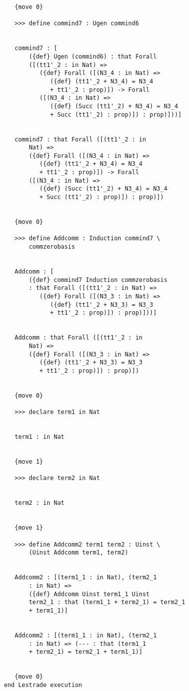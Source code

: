 \documentclass[12pt]{article}
\begin{document}
\begin{verbatim}
   {move 0}

   >>> define commind7 : Ugen commind6


   commind7 : [
       ({def} Ugen (commind6) : that Forall 
       ([(tt1'_2 : in Nat) => 
          ({def} Forall ([(N3_4 : in Nat) => 
             ({def} (tt1'_2 + N3_4) = N3_4 
             + tt1'_2 : prop)]) -> Forall 
          ([(N3_4 : in Nat) => 
             ({def} (Succ (tt1'_2) + N3_4) = N3_4 
             + Succ (tt1'_2) : prop)]) : prop)]))]


   commind7 : that Forall ([(tt1'_2 : in 
       Nat) => 
       ({def} Forall ([(N3_4 : in Nat) => 
          ({def} (tt1'_2 + N3_4) = N3_4 
          + tt1'_2 : prop)]) -> Forall 
       ([(N3_4 : in Nat) => 
          ({def} (Succ (tt1'_2) + N3_4) = N3_4 
          + Succ (tt1'_2) : prop)]) : prop)])


   {move 0}

   >>> define Addcomm : Induction commind7 \
       commzerobasis


   Addcomm : [
       ({def} commind7 Induction commzerobasis 
       : that Forall ([(tt1'_2 : in Nat) => 
          ({def} Forall ([(N3_3 : in Nat) => 
             ({def} (tt1'_2 + N3_3) = N3_3 
             + tt1'_2 : prop)]) : prop)]))]


   Addcomm : that Forall ([(tt1'_2 : in 
       Nat) => 
       ({def} Forall ([(N3_3 : in Nat) => 
          ({def} (tt1'_2 + N3_3) = N3_3 
          + tt1'_2 : prop)]) : prop)])


   {move 0}

   >>> declare term1 in Nat


   term1 : in Nat


   {move 1}

   >>> declare term2 in Nat


   term2 : in Nat


   {move 1}

   >>> define Addcomm2 term1 term2 : Uinst \
       (Uinst Addcomm term1, term2)


   Addcomm2 : [(term1_1 : in Nat), (term2_1 
       : in Nat) => 
       ({def} Addcomm Uinst term1_1 Uinst 
       term2_1 : that (term1_1 + term2_1) = term2_1 
       + term1_1)]


   Addcomm2 : [(term1_1 : in Nat), (term2_1 
       : in Nat) => (--- : that (term1_1 
       + term2_1) = term2_1 + term1_1)]


   {move 0}
end Lestrade execution
\end{verbatim}
\end{document}
